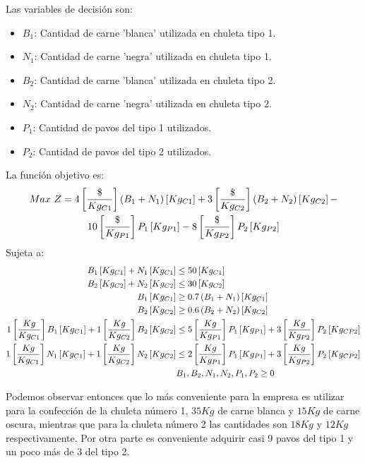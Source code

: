 \documentclass{tarea}
\begin{document}
\begin{homeworkProblem}[-1][Turkeyco]
Las variables de decisión son:
\begin{itemize}
	\item $B_1$: Cantidad de carne 'blanca' utilizada en chuleta tipo 1.
	\item $N_1$: Cantidad de carne 'negra' utilizada en chuleta tipo 1.
	\item $B_2$: Cantidad de carne 'blanca' utilizada en chuleta tipo 2.
	\item $N_2$: Cantidad de carne 'negra' utilizada en chuleta tipo 2.
	\item $P_1$: Cantidad de pavos del tipo 1 utilizados.
	\item $P_2$: Cantidad de pavos del tipo 2 utilizados.
\end{itemize}
La función objetivo es: 
\begin{multline}
	Max\ Z = 4\left[ \frac{\$}{Kg_{C1}} \right]\left( B_1 + N_1 \right)\left[ Kg_{C1} \right] +
	 3\left[ \frac{\$}{Kg_{C2}} \right]\left( B_2 + N_2 \right)\left[ Kg_{C2} \right] - \\
	  10\left[ \frac{\$}{Kg_{P1}} \right]P_1\left[ Kg_{P1} \right] -
	  8\left[ \frac{\$}{Kg_{P2}} \right]P_2\left[ Kg_{P2} \right]
\end{multline}
Sujeta a:
\begin{align*}
	B_1\left[ Kg_{C1} \right] + N_1\left[ Kg_{C1} \right] &\le 50\left[ Kg_{C1} \right] \\
	B_2\left[ Kg_{C2} \right] + N_2\left[ Kg_{C2} \right] &\le 30\left[ Kg_{C2} \right] \\
	B_1\left[ Kg_{C1} \right] &\ge 0.7\left( B_1 + N_1 \right)\left[ Kg_{C1} \right] \\
	B_2\left[ Kg_{C2} \right] &\ge 0.6\left( B_2 + N_2 \right)\left[ Kg_{C2} \right] \\
	1\left[ \frac{Kg}{Kg_{C1}} \right]B_1\left[ Kg_{C1} \right] + 1\left[ \frac{Kg}{Kg_{C2}} \right]B_2\left[ Kg_{C2} \right] &\le 5\left[ \frac{Kg}{Kg_{P1}} \right]P_1\left[ Kg_{P1} \right] + 3\left[ \frac{Kg}{Kg_{P2}} \right]P_2\left[ Kg_{CP2} \right]\\
	1\left[ \frac{Kg}{Kg_{C1}} \right]N_1\left[ Kg_{C1} \right] + 1\left[ \frac{Kg}{Kg_{C2}} \right]N_2\left[ Kg_{C2} \right] &\le 2\left[ \frac{Kg}{Kg_{P1}} \right]P_1\left[ Kg_{P1} \right] + 3\left[ \frac{Kg}{Kg_{P2}} \right]P_2\left[ Kg_{CP2} \right]\\
	&B_1,B_2,N_1,N_2,P_1,P_2 \ge 0
\end{align*}

Podemos observar entonces que lo más conveniente para la empresa es utilizar para la confección de la chuleta número 1, $35Kg$ de carne blanca y $15Kg$ de carne oscura, mientras que para la chuleta número 2 las cantidades son $18Kg$ y $12Kg$ respectivamente. Por otra parte es conveniente adquirir casi 9 pavos del tipo 1 y un poco más de 3 del tipo 2.

\end{homeworkProblem}
\end{document}
